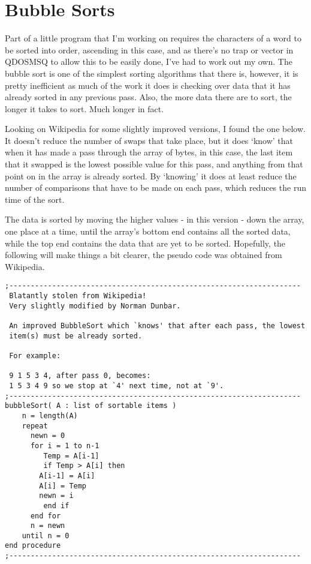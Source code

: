\chapter{Bubble Sorts}
Part of a little program that I'm working on requires the characters of a word to be sorted into order, ascending in this case, and as there's no trap or vector in QDOSMSQ to allow this to be easily done, I've had to work out my own. The bubble sort is one of the simplest sorting algorithms that there is, however, it is pretty inefficient as much of the work it does is checking over data that it has already sorted in any previous pass. Also, the more data there are to sort, the longer it takes to sort. Much longer in fact.

Looking on Wikipedia for some slightly improved versions, I found the one below. It doesn't reduce the number of swaps that take place, but it does `know' that when it has made a pass through the array of bytes, in this case, the last item that it swapped is the lowest possible value for this pass, and anything from that point on in the array is already sorted. By `knowing' it does at least reduce the number of  comparisons that have to be made on each pass, which reduces the run time of the sort.

The data is sorted by moving  the higher values - in this version - down the array, one place at a time, until the array's bottom end contains all the sorted data, while the top end contains the data that are yet to be sorted. Hopefully, the following will make things a bit clearer, the pseudo code was obtained from Wikipedia.


\begin{lstlisting}[frame=none,numbers=none,caption={Bubblesort Algorithm}]
;--------------------------------------------------------------------
 Blatantly stolen from Wikipedia! 
 Very slightly modified by Norman Dunbar.

 An improved BubbleSort which `knows' that after each pass, the lowest 
 item(s) must be already sorted.

 For example:

 9 1 5 3 4, after pass 0, becomes:
 1 5 3 4 9 so we stop at `4' next time, not at `9'.
;--------------------------------------------------------------------
bubbleSort( A : list of sortable items )
    n = length(A)
    repeat
      newn = 0
      for i = 1 to n-1 
         Temp = A[i-1]
         if Temp > A[i] then
        A[i-1] = A[i]
        A[i] = Temp
        newn = i
         end if
      end for
      n = newn
    until n = 0
end procedure
;--------------------------------------------------------------------
\end{lstlisting}

